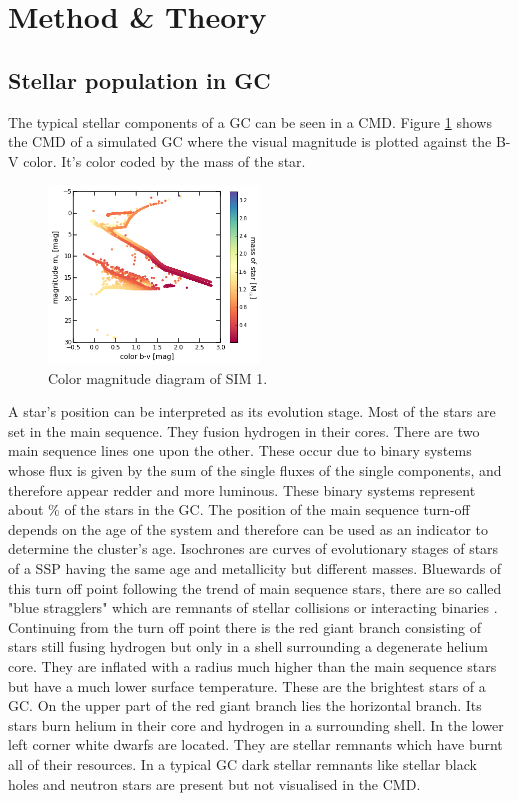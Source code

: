\section{Method \& Theory}\label{method_theory}
\subsection{Stellar population in GC}\label{cmd_theory}
The typical stellar components of a \ac{GC} can be seen in a \ac{CMD}. Figure \ref{fig:cmd} shows the \ac{CMD} of a simulated \ac{GC} where the visual magnitude is plotted against the B-V color. It's color coded by the mass of the star. 
\begin{figure}[htbp]
\centering
	\includegraphics[width=0.5\textwidth]{Plots/color_magnitude_diagram.png}
	\caption{Color magnitude diagram of SIM 1.}
	\label{fig:cmd}
\end{figure}
A star's position can be interpreted as its evolution stage. Most of the stars are set in the main sequence. They fusion hydrogen in their cores. There are two main sequence lines one upon the other. These occur due to binary systems whose flux is given by the sum of the single fluxes of the single components, and therefore appear redder and more luminous. These binary systems represent about \unit[5]{\%} of the stars in the \ac{GC}. The position of the main sequence turn-off depends on the age of the system and therefore can be used as an indicator to determine the cluster's age. Isochrones are curves of evolutionary stages of stars of a \ac{SSP} having the same age and metallicity but different masses. Bluewards of this turn off point following the trend of main sequence stars, there are so called "blue stragglers" which are remnants of stellar collisions or interacting binaries \citep[p.628]{2008gady.book.....B}. Continuing from the turn off point there is the red giant branch consisting of stars still fusing hydrogen but only in a shell surrounding a degenerate helium core. They are inflated with a radius much higher than the main sequence stars but have a much lower surface temperature. These are the brightest stars of a \ac{GC}. On the upper part of the red giant branch lies the horizontal branch. Its stars burn helium in their core and hydrogen in a surrounding shell. In the lower left corner white dwarfs are located. They are stellar remnants which have burnt all of their resources. In a typical \ac{GC} dark stellar remnants like stellar black holes and neutron stars are present but not visualised in the \ac{CMD}. 
